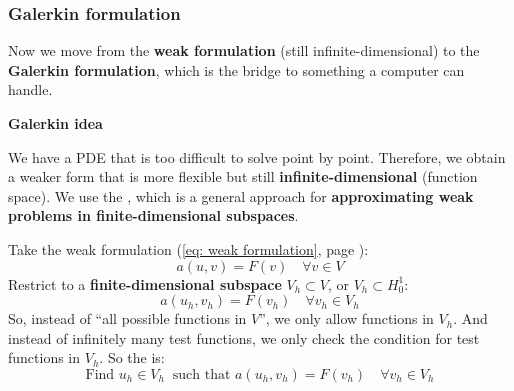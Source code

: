 \subsubsection{Galerkin formulation}

Now we move from the \textbf{weak formulation} (still infinite-dimensional) to the \textbf{Galerkin formulation}, which is the bridge to something a computer can handle.

\highspace
\begin{flushleft}
    \textcolor{Green3}{ \textbf{Galerkin idea}}
\end{flushleft}
We have a PDE that is too difficult to solve point by point. Therefore, we obtain a weaker form that is more flexible but still \textbf{infinite-dimensional} (function space). We use the , which is a general approach for \textbf{approximating weak problems in finite-dimensional subspaces}.

\highspace
Take the weak formulation (\ref{eq: weak formulation}, page \pageref{eq: weak formulation}):
\begin{equation*}
    a(u,v) = F(v) \quad \forall v \in V
\end{equation*}
Restrict to a \textbf{finite-dimensional subspace} $V_h \subset V$, or $V_{h} \subset H_{0}^{1}$:
\begin{equation}
    a(u_h,v_h) = F(v_h) \quad \forall v_h \in V_h
\end{equation}
So, instead of ``all possible functions in $V$'', we only allow functions in $V_h$. And instead of infinitely many test functions, we only check the condition for test functions in $V_h$. So the  is:
\begin{equation}
    \text{Find } u_h \in V_h \;\; \text{such that } a(u_h,v_h) = F(v_h) \quad \forall v_h \in V_h
\end{equation}

